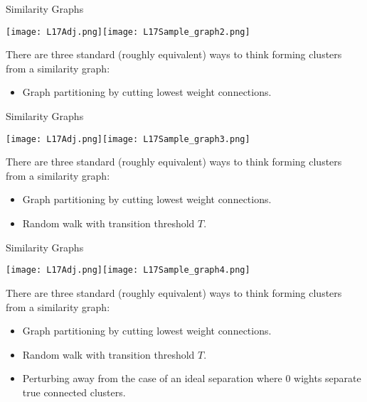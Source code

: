 \documentclass[10pt, table, dvipsnames,xcdraw,handout]{beamer}
\begin{document}
\begin{frame}[fragile]{Similarity Graphs}
  \begin{minipage}[t][0.5\textheight][t]{\textwidth}
	\centering \texttt{[image: L17Adj.png]}\texttt{[image: L17Sample\_graph2.png]} 
  \end{minipage}
  \vfill
\begin{minipage}[t][0.5\textheight][t]{\textwidth}
There are three standard (roughly equivalent) ways to think forming clusters from a similarity graph: 
\begin{itemize}
\item[] Graph partitioning by cutting lowest weight connections. 
\end{itemize}
\end{minipage}
\end{frame}


\begin{frame}[fragile]{Similarity Graphs}
  \begin{minipage}[t][0.5\textheight][t]{\textwidth}
	\centering \texttt{[image: L17Adj.png]}\texttt{[image: L17Sample\_graph3.png]} 
  \end{minipage}
  \vfill
\begin{minipage}[t][0.5\textheight][t]{\textwidth}
There are three standard (roughly equivalent) ways to think forming clusters from a similarity graph: 
\begin{itemize}
\item[] Graph partitioning by cutting lowest weight connections. 
\item[] Random walk with transition threshold $T$.
\end{itemize}
\end{minipage}
\end{frame}

\begin{frame}[fragile]{Similarity Graphs}
  \begin{minipage}[t][0.5\textheight][t]{\textwidth}
	\centering \texttt{[image: L17Adj.png]}\texttt{[image: L17Sample\_graph4.png]} 
  \end{minipage}
  \vfill
\begin{minipage}[t][0.5\textheight][t]{\textwidth}
There are three standard (roughly equivalent) ways to think forming clusters from a similarity graph: 
\begin{itemize}
\item[] Graph partitioning by cutting lowest weight connections. 
\item[] Random walk with transition threshold $T$.
\item[] Perturbing away from the case of an ideal separation where 0 wights separate true connected clusters.  
\end{itemize}
\end{minipage}
\end{frame}
\end{document}
